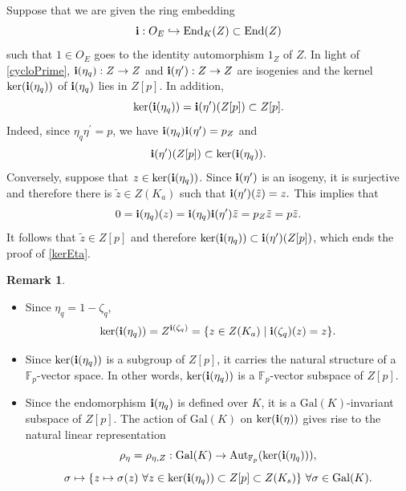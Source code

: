 \documentclass[12pt,a4paper,reqno]{amsart}
\def\F{{\mathbb F}}
\def\Gal{\mathrm{Gal}}
\def\End{\mathrm{End}}
\def\Aut{\mathrm{Aut}}
\theoremstyle{definition}
\newtheorem{rem}[thm]{Remark}
\begin{document}
Suppose that we are given the ring embedding
$${\bf i}:O_E\hookrightarrow \End_K(Z)\subset \End(Z)$$
such that $1\in O_E$ goes to the identity automorphism $1_Z$ of $Z$.
In light of \eqref{cycloPrime},  ${\bf i}(\eta_q): Z \to Z$  and  ${\bf i}(\eta^{\prime}): Z \to Z$ are isogenies and the kernel
$\ker({\bf i}(\eta_q))$  of ${\bf i}(\eta_q)$ lies in $Z[p]$. In addition,
\begin{equation}
\label{kerEta}
\ker({\bf i}(\eta_q))={\bf i}(\eta^{\prime})(Z[p])\subset Z[p].
\end{equation}
Indeed, since $\eta_q \eta^{\prime}=p$,  we have  ${\bf i}(\eta_q){\bf i}( \eta^{\prime})=p_Z$ and
$${\bf i}(\eta^{\prime})(Z[p])\subset \ker({\bf i}(\eta_q)).$$
Conversely, suppose that $z \in \ker({\bf i}(\eta_q))$. Since ${\bf i}(\eta^{\prime})$ is an isogeny, it is surjective and therefore
there is $\tilde{z} \in Z(K_a)$ such that ${\bf i}(\eta^{\prime})(\tilde{z})=z.$ This implies that
$$0={\bf i}(\eta_q)(z)={\bf i}(\eta_q){\bf i}(\eta^{\prime})\tilde{z}=p_Z \tilde{z}=p \tilde{z}.$$
It follows  that $\tilde{z} \in Z[p]$ and therefore $\ker({\bf i}(\eta_q))\subset {\bf i}(\eta^{\prime})(Z[p])$,
which ends the proof of \eqref{kerEta}.

\begin{rem}
\label{invDeltaQ}
\begin{itemize}
\item[(i)]
Since $\eta_q=1-\zeta_q$,
\begin{equation}
\label{invariantKer}
\ker({\bf i}(\eta_q))=Z^{{\bf i}(\zeta_q)}=\{z \in Z(K_a)\mid {\bf i}(\zeta_q)(z)=z\}.
\end{equation}
\item[(ii)]
Since $\ker({\bf i}(\eta_q))$ is a subgroup of $Z[p]$, it carries the natural structure of a $\F_p$-vector space.
In other words,  $\ker({\bf i}(\eta_q))$  is a $\F_p$-vector subspace of $Z[p]$.
\item[(iii)]
Since the endomorphism  ${\bf i}(\eta_q)$ is defined over $K$, it is a $\Gal(K)$-invariant subspace  of $Z[p]$. The action of $\Gal(K)$
on $\ker({\bf i}(\eta))$  gives rise to the natural linear representation
\begin{equation}
\label{rhoEta}
\rho_{\eta}=\rho_{\eta,Z}: \Gal(K) \to \Aut_{\F_p}(\ker({\bf i}(\eta_q))),
\end{equation}
 $$ \sigma \mapsto \{z \mapsto \sigma(z) \ \forall z \in \ker({\bf i}(\eta_q))\subset Z[p]\subset Z(K_s)\} \ \forall
\sigma \in \Gal(K).$$
\end{itemize}
\end{rem}
\end{document}
